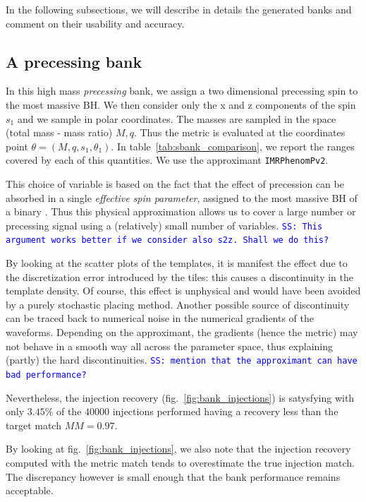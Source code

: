 \documentclass[twocolumn,showpacs,preprintnumbers,nofootinbib,prd,
superscriptaddress,10pt]{revtex4-1}
\newcommand{\stefano}[1]{{\textcolor{blue}{\texttt{SS: #1}} }}
\begin{document}
In the following subsections, we will describe in details the generated banks and comment on their usability and accuracy.

\subsection{A precessing bank}\label{sec:precessing_bank}
	
In this high mass {\it precessing} bank, we assign a two dimensional precessing spin to the most massive BH. We then consider only the x and z components of the spin $s_1$ and we sample in polar coordinates. The masses are sampled in the space (total mass - mass ratio) $M,q$.  Thus the metric is evaluated at the coordinates point $\theta = (M, q, s_1, \theta_1)$. In table~\ref{tab:sbank_comparison}, we report the ranges covered by each of this quantities. We use the approximant \texttt{IMRPhenomPv2}.

This choice of variable is based on the fact that the effect of precession can be absorbed in a single {\it effective spin parameter}, assigned to the most massive BH of a binary \cite{}. Thus this physical approximation allows us to cover a large number or precessing signal using a (relatively) small number of variables. \stefano{This argument works better if we consider also s2z. Shall we do this?}

By looking at the scatter plots of the templates, it is manifest the effect due to the discretization error introduced by the tiles: this causes a discontinuity in the template density. Of course, this effect is unphysical and would have been avoided by a purely stochastic placing method.
Another possible source of discontinuity can be traced back to numerical noise in the numerical gradients of the waveforms. Depending on the approximant, the gradients (hence the metric) may not behave in a smooth way all across the parameter space, thus explaining (partly) the hard discontinuities.
\stefano{mention that the approximant can have bad performance?}

Nevertheless, the injection recovery (fig.~\ref{fig:bank_injections}) is satysfying with only $3.45\%$ of the $40000$ injections performed having a recovery less than the target match $MM = 0.97$.

By looking at fig.~\ref{fig:bank_injections}, we also note that the injection recovery computed with the metric match tends to overestimate the true injection match. The discrepancy however is small enough that the bank performance remains acceptable.
\end{document}
